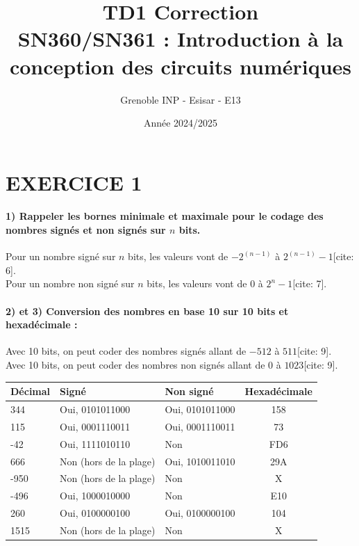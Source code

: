 \documentclass[11pt,a4paper]{article}
\title{TD1 Correction \\ \large SN360/SN361 : Introduction à la conception des circuits numériques}
\author{Grenoble INP - Esisar - E13}
\date{Année 2024/2025}
\begin{document}
\maketitle

\section*{EXERCICE 1}

\paragraph{1) Rappeler les bornes minimale et maximale pour le codage des nombres signés et non signés sur $n$ bits.}
Pour un nombre signé sur $n$ bits, les valeurs vont de $-2^{(n-1)}$ à $2^{(n-1)}-1$[cite: 6].\\
Pour un nombre non signé sur $n$ bits, les valeurs vont de $0$ à $2^{n}-1$[cite: 7].

\paragraph{2) et 3) Conversion des nombres en base 10 sur 10 bits et hexadécimale :}
Avec 10 bits, on peut coder des nombres signés allant de $-512$ à $511$[cite: 9].\\
Avec 10 bits, on peut coder des nombres non signés allant de $0$ à $1023$[cite: 9].

\begin{table}[h!]
    \centering
    \begin{tabular}{lllc}
        \toprule
        \textbf{Décimal} & \textbf{Signé} & \textbf{Non signé} & \textbf{Hexadécimale} \\
        \midrule
        344 & Oui, 0101011000 & Oui, 0101011000 & 158 \\
        115 & Oui, 0001110011 & Oui, 0001110011 & 73 \\
        -42 & Oui, 1111010110 & Non & FD6 \\
        666 & Non (hors de la plage) & Oui, 1010011010 & 29A \\
        -950 & Non (hors de la plage) & Non & X \\
        -496 & Oui, 1000010000 & Non & E10 \\
        260 & Oui, 0100000100 & Oui, 0100000100 & 104 \\
        1515 & Non (hors de la plage) & Non & X \\
        \bottomrule
    \end{tabular}
\end{table}
\end{document}
